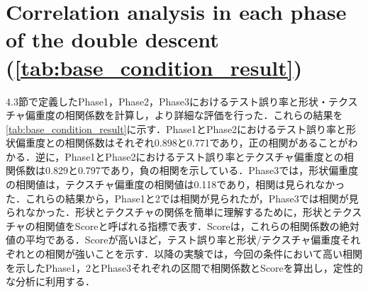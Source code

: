 \begin{figure}[h]
{}
\label{fig:overview}
\end{figure}

\newpage

\section[Correlation analysis in each phase of the double descent]{
Correlation analysis in each phase of the double descent (\cref{tab:base_condition_result})
}
4.3節で定義したPhase1，Phase2，Phase3におけるテスト誤り率と形状・テクスチャ偏重度の相関係数を計算し，より詳細な評価を行った．これらの結果を\cref{tab:base_condition_result}に示す．Phase1とPhase2におけるテスト誤り率と形状偏重度との相関係数はそれぞれ0.898と0.771であり，正の相関があることがわかる．逆に，Phase1とPhase2におけるテスト誤り率とテクスチャ偏重度との相関係数は\textminus0.829と\textminus0.797であり，負の相関を示している．Phase3では，形状偏重度の相関値は，テクスチャ偏重度の相関値は0.118であり，相関は見られなかった．これらの結果から，Phase1と2では相関が見られたが，Phase3では相関が見られなかった．形状とテクスチャの関係を簡単に理解するために，形状とテクスチャの相関値をScoreと呼ばれる指標で表す．Scoreは，これらの相関係数の絶対値の平均である．Scoreが高いほど，テスト誤り率と形状/テクスチャ偏重度それぞれとの相関が強いことを示す．以降の実験では，今回の条件において高い相関を示したPhase1，2とPhase3それぞれの区間で相関係数とScoreを算出し，定性的な分析に利用する．

